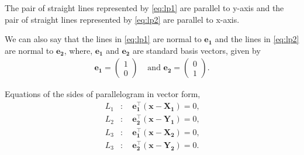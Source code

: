\documentclass[journal,12pt,twocolumn]{IEEEtran}
\let\vec\mathbf
\newcommand{\myvec}[1]{\ensuremath{\begin{pmatrix}#1\end{pmatrix}}}
\providecommand{\brak}[1]{\ensuremath{\left(#1\right)}}
\begin{document}

The pair of straight lines represented by \eqref{eq:lp1} are parallel to y-axis and the pair of straight lines represented by \eqref{eq:lp2} are parallel to x-axis.


We can also say that the lines in \eqref{eq:lp1} are normal to $\vec{e_1}$ and the lines in \eqref{eq:lp2} are normal to $\vec{e_2}$,  
where, $\vec{e_1}$ and $\vec{e_2}$ are standard basis vectors, given by
\begin{align*}
		\vec{e_1} = \myvec{1\\0} &\text{ and   }
		\vec{e_2} = \myvec{0\\1} \text{.} 
\end{align*}

Equations of the sides of parallelogram in vector form,  
\begin{align}
		L_1 &\colon \quad \vec{e_1^{\top}}\brak{{\vec{x}-\vec{X_1}}} = 0\text{,} \label{eq:line_1}\\
		L_2 &\colon \quad \vec{e_2^{\top}}\brak{{\vec{x}-\vec{Y_1}}} = 0\text{,} \label{eq:line_2}\\
		L_3 &\colon \quad \vec{e_1^{\top}}\brak{{\vec{x}-\vec{X_2}}} = 0\text{,} \label{eq:line_3}\\
		L_3 &\colon \quad \vec{e_2^{\top}}\brak{{\vec{x}-\vec{Y_2}}} = 0\text{.} \label{eq:line_4}
\end{align}
\end{document}
